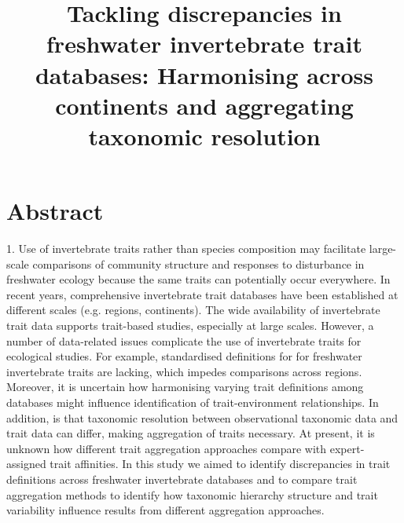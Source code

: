 \documentclass{article}
\title{Tackling discrepancies in freshwater invertebrate trait databases: Harmonising across continents and aggregating taxonomic resolution}
\author{}%
\date{}
\begin{document}
\maketitle


\section*{Abstract}




1. Use of invertebrate traits rather than species composition may facilitate large-scale comparisons of community structure and responses to disturbance in freshwater ecology because the same traits can potentially occur everywhere.  In recent years, comprehensive invertebrate trait databases have been established at different scales (e.g. regions, continents). The wide availability of invertebrate trait data supports trait-based studies, especially at large scales. However, a number of data-related issues complicate the use of invertebrate traits for ecological studies. For example, standardised definitions for for freshwater invertebrate traits are lacking, which impedes comparisons across regions. Moreover, it is uncertain how harmonising varying trait definitions among databases might influence identification of trait-environment relationships. In addition, is that taxonomic resolution between observational taxonomic data and trait data can differ, making aggregation of traits necessary. At present, it is unknown how different trait aggregation approaches compare with expert-assigned trait affinities. In this study we aimed to identify discrepancies in trait definitions across freshwater invertebrate databases and to compare trait aggregation methods to identify how taxonomic hierarchy structure and trait variability influence results from different aggregation approaches.
\end{document}
